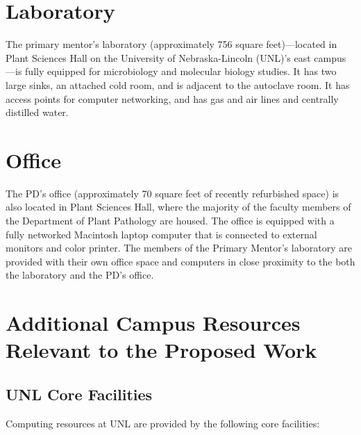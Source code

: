 \documentclass[12pt,letterpaper]{article}
\title{\ruleline{Facilities \& Other Resources}}
\begin{document}
\maketitle

\section{Laboratory}

The primary mentor's laboratory (approximately 756 square feet)---located in Plant Sciences Hall on the University of Nebraska-Lincoln (UNL)'s east campus---is fully equipped for microbiology and molecular biology studies. It has two large sinks, an attached cold room, and is adjacent to the autoclave room. It has access points for computer networking, and has gas and air lines and centrally distilled water.

\section{Office}

The PD's office (approximately 70 square feet of recently refurbished space) is also located in Plant Sciences Hall, where the majority of the faculty members of the Department of Plant Pathology are housed. The office is equipped with a fully networked Macintosh laptop computer that is connected to external monitors and color printer. The members of the Primary Mentor's laboratory are provided with their own office space and computers in close proximity to the both the laboratory and the PD's office.

\section{Additional Campus Resources Relevant to the Proposed Work}

\subsection{UNL Core Facilities}

Computing resources at UNL are provided by the following core facilities:
\end{document}
